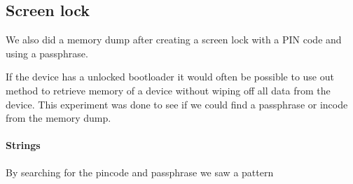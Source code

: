   \subsection{Screen lock}
  We also did a memory dump after creating a screen lock with a PIN code and using a passphrase.
  
  If the device has a unlocked bootloader it would often be possible to use out 
  method to retrieve memory of a device without wiping off all data from the 
  device. This experiment was done to see if we could find a passphrase or 
  incode from the memory dump.

  \paragraph{Strings}
  By searching for the pincode and passphrase we saw a pattern 
